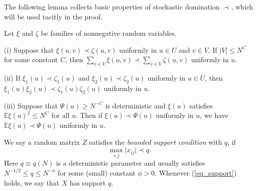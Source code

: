 The following lemma collects basic properties of stochastic domination $\prec$, which will be used tacitly in the proof.

\begin{lemma}\label{lem_stodomin}
Let $\xi$ and $\zeta$ be families of nonnegative random variables.

(i) Suppose that $\xi (u,v)\prec \zeta(u,v)$ uniformly in $u\in U$ and $v\in V$. If $|V|\le N^C$ for some constant $C$, then $\sum_{v\in V} \xi(u,v) \prec \sum_{v\in V} \zeta(u,v)$ uniformly in $u$.

(ii) If $\xi_1 (u)\prec \zeta_1(u)$ and $\xi_2 (u)\prec \zeta_2(u)$ uniformly in $u\in U$, then $\xi_1(u)\xi_2(u) \prec \zeta_1(u)\zeta_2(u)$ uniformly in $u$.

(iii) Suppose that $\Psi(u)\ge N^{-C}$ is deterministic and $\xi(u)$ satisfies $\mathbb E\xi(u)^2 \le N^C$ for all $u$. Then if $\xi(u)\prec \Psi(u)$ uniformly in $u$, we have $\mathbb E\xi(u) \prec \Psi(u)$ uniformly in $u$.
\end{lemma}


\begin{definition} \label{defn_support}
We say a random matrix $Z$ satisfies the {\it{bounded support condition}} with $q$, if
\begin{equation}
\max_{i,j}\vert x_{ij}\vert \prec q. \label{eq_support}
\end{equation}
Here $q\equiv q(N)$ is a deterministic parameter and usually satisfies $ N^{-{1}/{2}} \leq q \leq N^{- \phi} $ for some (small) constant $\phi>0$. Whenever (\ref{eq_support}) holds, we say that $X$ has support $q$. 
\end{definition}


